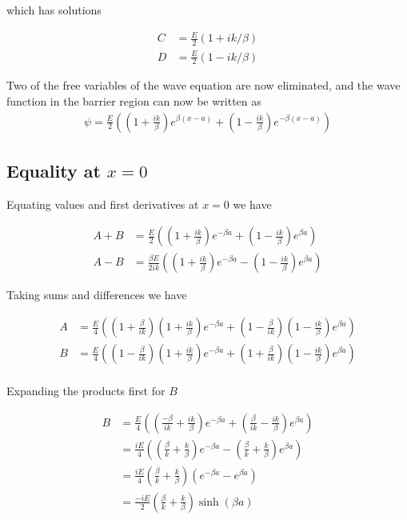 \documentclass{article}
\begin{document}
which has solutions

\begin{align*}
C &= \frac{E}{2}( 1 + i k/\beta ) \\
D &= \frac{E}{2}( 1 - i k/\beta )
\end{align*}

Two of the free variables of the wave equation are now eliminated, and the wave function in the barrier region can now be written as
\begin{align}\label{eqn:psiInBarrier}
\psi =
\frac{E}{2}\left( \left( 1 + \frac{i k}{\beta} \right) e^{ \beta(x-a)} + \left( 1 - \frac{i k}{\beta} \right) e^{ -\beta(x-a)} \right)
\end{align}

\subsection{ Equality at $x=0$ }

Equating values and first derivatives at $x=0$ we have

\begin{align*}
A + B &=
\frac{E}{2}\left( \left( 1 + \frac{i k}{\beta} \right) e^{ -\beta a} + \left( 1 - \frac{i k}{\beta} \right) e^{ \beta a } \right) \\
A - B &=
\frac{\beta E}{2 i k}\left( \left( 1 + \frac{i k}{\beta} \right) e^{ -\beta a} - \left( 1 - \frac{i k}{\beta} \right) e^{ \beta a } \right)
\end{align*}

Taking sums and differences we have

\begin{align*}
A &= \frac{E}{4}\left( \left(1 + \frac{\beta}{ik}\right)\left( 1 + \frac{i k}{\beta} \right) e^{ -\beta a} + \left(1 - \frac{\beta}{ik}\right)\left( 1 - \frac{i k}{\beta} \right) e^{ \beta a } \right) \\
B &= \frac{E}{4}\left( \left(1 - \frac{\beta}{ik}\right)\left( 1 + \frac{i k}{\beta} \right) e^{ -\beta a} + \left(1 + \frac{\beta}{ik}\right)\left( 1 - \frac{i k}{\beta} \right) e^{ \beta a } \right) \\
\end{align*}

Expanding the products first for $B$

\begin{align*}
B 
&= \frac{E}{4}\left( \left(\frac{-\beta}{ik} + \frac{ik}{\beta} \right) e^{ -\beta a} + \left(\frac{\beta}{ik} - \frac{ik}{\beta} \right) e^{ \beta a } \right) \\
&= \frac{iE}{4}\left( \left(\frac{\beta}{k} + \frac{k}{\beta} \right) e^{ -\beta a} - \left(\frac{\beta}{k} + \frac{k}{\beta} \right) e^{ \beta a } \right) \\
&= \frac{iE}{4}\left(\frac{\beta}{k} + \frac{k}{\beta} \right) \left( e^{ -\beta a} - e^{ \beta a } \right) \\
&= \frac{-iE}{2}\left(\frac{\beta}{k} + \frac{k}{\beta} \right) \sinh\left( \beta a \right) \\
\end{align*}
\end{document}
